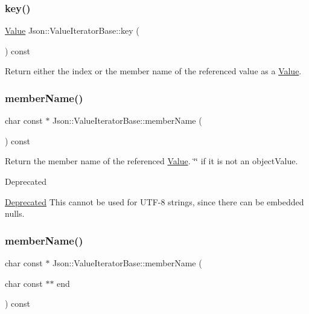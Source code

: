\subsubsection{\texorpdfstring{key()}{key()}}
{\footnotesize\ttfamily \hyperlink{class_json_1_1_value}{Value} Json\+::\+Value\+Iterator\+Base\+::key (\begin{DoxyParamCaption}{ }\end{DoxyParamCaption}) const}

Return either the index or the member name of the referenced value as a \hyperlink{class_json_1_1_value}{Value}. \mbox{\label{class_json_1_1_value_iterator_base_a54765da6759fd3f1edcbfbaf308ec263}} 
\subsubsection{\texorpdfstring{member\+Name()}{memberName()}\hspace{0.1cm}{\footnotesize\ttfamily [1/2]}}
{\footnotesize\ttfamily char const  $\ast$ Json\+::\+Value\+Iterator\+Base\+::member\+Name (\begin{DoxyParamCaption}{ }\end{DoxyParamCaption}) const}

Return the member name of the referenced \hyperlink{class_json_1_1_value}{Value}. \char`\"{}\char`\"{} if it is not an object\+Value. \begin{DoxyRefDesc}{Deprecated}
\item[\hyperlink{deprecated__deprecated000004}{Deprecated}]This cannot be used for U\+T\+F-\/8 strings, since there can be embedded nulls. \end{DoxyRefDesc}
\mbox{\label{class_json_1_1_value_iterator_base_a391c9cbd0edf9a447b37df00e8ce6059}} 
\subsubsection{\texorpdfstring{member\+Name()}{memberName()}\hspace{0.1cm}{\footnotesize\ttfamily [2/2]}}
{\footnotesize\ttfamily char const  $\ast$ Json\+::\+Value\+Iterator\+Base\+::member\+Name (\begin{DoxyParamCaption}\item[{char const $\ast$$\ast$}]{end }\end{DoxyParamCaption}) const}

